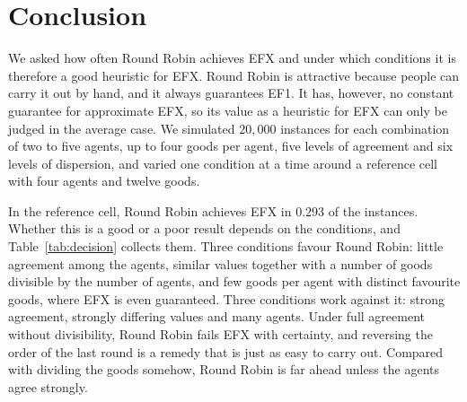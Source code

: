 \chapter{Conclusion}\label{ch:conclusion}

We asked how often Round Robin achieves EFX and under which conditions it is therefore a good
heuristic for EFX. Round Robin is attractive because people can carry it out by hand, and it
always guarantees EF1. It has, however, no constant guarantee for approximate EFX, so its value
as a heuristic for EFX can only be judged in the average case. We simulated $20{,}000$ instances
for each combination of two to five agents, up to four goods per agent, five levels of agreement
and six levels of dispersion, and varied one condition at a time around a reference cell with
four agents and twelve goods.

In the reference cell, Round Robin achieves EFX in $0.293$ of the instances. Whether this is a
good or a poor result depends on the conditions, and Table~\ref{tab:decision} collects them. Three
conditions favour Round Robin: little agreement among the agents, similar values together with a
number of goods divisible by the number of agents, and few goods per agent with distinct
favourite goods, where EFX is even guaranteed. Three conditions work against it: strong
agreement, strongly differing values and many agents. Under full agreement without
divisibility, Round Robin fails EFX with certainty, and reversing the order of the last round is
a remedy that is just as easy to carry out. Compared with dividing the goods somehow, Round Robin
is far ahead unless the agents agree strongly.

